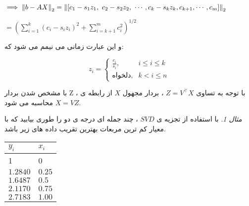 \documentclass{article}
\theoremstyle{remark}		%
\newtheorem{example}{مثال}		%
\begin{document}
\begin{flushleft}
	 $\implies \norm{b-AX}_2 = \norm{[c_1 - s_1 z_1, \ c_2 - s_2 z_2, \ \cdots , c_k - s_k z_k , c_{k+1},  \cdots , c_m]}_2$
\end{flushleft}
\begin{flushleft}
	$= (\sum\limits_{i=1}^{k} (c_i-s_iz_i)^2 + \sum\limits_{i=k+1}^{m}c^2_i)^{1/2}$
\end{flushleft}
و این عبارت زمانی می نیمم می شود که:
\begin{flushleft}
	\[
	z_i = 
	\begin{cases}
		\frac{c_i}{s_i}, & i\leq i \leq k \\
		\text{دلخواه}, & k < i \leq n
	\end{cases}
	\]
\end{flushleft}
با مشخص شدن بردار Z ، با توجه به تساوی $Z=V^\top X$ ، بردار مجهول $X$ از رابطه ی $X=VZ$ محاسبه می شود. \\
\begin{example}
با استفاده از تجزیه ی  $SVD$ ، چند جمله ای درجه ی دو را طوری بیابید که با معیار کم ترین مربعات بهترین تقریب داده های زیر باشد.\\
\begin{flushleft}
\begin{tabular}{l | l}
	$y_i$ & $x_i$ \\
	\hline
	1 & 0 \\
	$1.2840$ & $0.25$  \\
	$1.6487$ & $0.5$   \\
	$2.1170$ & $0.75$  \\
	$2.7183$ & $1.00$  
\end{tabular}
\end{flushleft}

\end{example}
\end{document}
